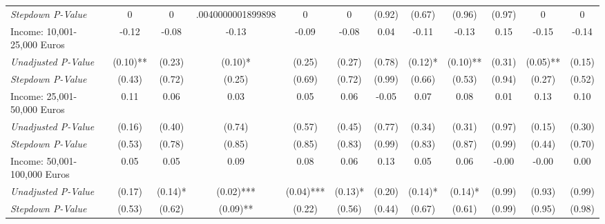 \begin{tabular}{l c c c c c c c c c c c}
\quad \textit{Stepdown P-Value} & 0 & 0 & .0040000001899898 & 0 & 0 & (0.92) & (0.67) & (0.96) & (0.97) & 0 & 0 \\
Income: 10,001-25,000 Euros & -0.12 & -0.08 & -0.13 & -0.09 & -0.08 & 0.04 & -0.11 & -0.13 & 0.15 & -0.15 & -0.14 \\
\quad \textit{Unadjusted P-Value} & (0.10)** & (0.23) & (0.10)* & (0.25) & (0.27) & (0.78) & (0.12)* & (0.10)** & (0.31) & (0.05)** & (0.15) \\
\quad \textit{Stepdown P-Value} & (0.43) & (0.72) & (0.25) & (0.69) & (0.72) & (0.99) & (0.66) & (0.53) & (0.94) & (0.27) & (0.52) \\
Income: 25,001-50,000 Euros & 0.11 & 0.06 & 0.03 & 0.05 & 0.06 & -0.05 & 0.07 & 0.08 & 0.01 & 0.13 & 0.10 \\
\quad \textit{Unadjusted P-Value} & (0.16) & (0.40) & (0.74) & (0.57) & (0.45) & (0.77) & (0.34) & (0.31) & (0.97) & (0.15) & (0.30) \\
\quad \textit{Stepdown P-Value} & (0.53) & (0.78) & (0.85) & (0.85) & (0.83) & (0.99) & (0.83) & (0.87) & (0.99) & (0.44) & (0.70) \\
Income: 50,001-100,000 Euros & 0.05 & 0.05 & 0.09 & 0.08 & 0.06 & 0.13 & 0.05 & 0.06 & -0.00 & -0.00 & 0.00 \\
\quad \textit{Unadjusted P-Value} & (0.17) & (0.14)* & (0.02)*** & (0.04)*** & (0.13)* & (0.20) & (0.14)* & (0.14)* & (0.99) & (0.93) & (0.99) \\
\quad \textit{Stepdown P-Value} & (0.53) & (0.62) & (0.09)** & (0.22) & (0.56) & (0.44) & (0.67) & (0.61) & (0.99) & (0.95) & (0.98) \\
\bottomrule
\end{tabular}
